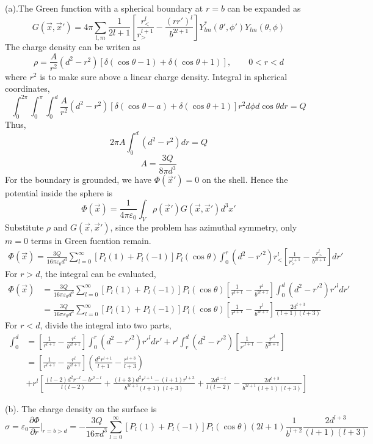 \documentclass{article}
\newcommand{\pd}[2]{\frac{\partial#1}{\partial#2}}
\begin{document}
(a).The Green function with a spherical boundary at $r=b$ can be expanded as
\[ G(\vec x,\vec x')=4\pi\sum_{l,m}\frac{1}{2l+1}[\frac{r_<^l}{r_>^{l+1}}-\frac{(rr')^l}{b^{2l+1}}]Y^*_{lm}(\theta',\phi')Y_{lm}(\theta,\phi)   \]
The charge density can be writen as
\[\rho=\frac{A}{r^2}(d^2-r^2)[\delta(\cos\theta-1)+\delta(\cos\theta+1)],\qquad 0<r<d \]
where $r^2$ is to make sure above a linear charge density. Integral in spherical coordinates,
\[ \int_0^{2\pi}\int_0^{\pi}\int_0^d\frac{A}{r^2}(d^2-r^2)[\delta(\cos\theta-a)+\delta(\cos\theta+1)]r^2d\phi d\cos\theta dr=Q \]
Thus,
\[2\pi A\int_0^d (d^2-r^2)dr=Q\]
\[ A=\frac{3Q}{8\pi d^3}\]
For the boundary is grounded, we have $\Phi(\vec x')=0$ on the shell. Hence the potential inside the sphere is
\[\Phi(\vec x)=\frac{1}{4\pi\varepsilon_0}\int_V\rho(\vec x')G(\vec x,\vec x')d^3 x'\]
Substitute $\rho$ and $G(\vec x,\vec x')$, since the problem has azimuthal symmetry, only $m=0$ terms in Green fucntion remain.
\begin{align*}
  \Phi(\vec x)=\frac{3Q}{16\pi\varepsilon_0 d^3}\sum^\infty_{l=0}[P_l(1)+P_l(-1)]P_l(\cos\theta)\int_0^r(d^2-r'^2)r_<^l[\frac{1}{r_>^{l+1}}-\frac{r_>^l}{b^{2l+1}}]dr'
\end{align*}
For $r>d$, the integral can be evaluated,
\begin{align*}
  \Phi(\vec x)&=\frac{3Q}{16\pi\varepsilon_0 d^3}\sum^\infty_{l=0}[P_l(1)+P_l(-1)]P_l(\cos\theta)[\frac{1}{r^{l+1}}-\frac{r^l}{b^{2l+1}}]\int_0^d(d^2-r'^2)r'^ldr'\\
              &=\frac{3Q}{16\pi\varepsilon_0 d^3}\sum^\infty_{l=0}[P_l(1)+P_l(-1)]P_l(\cos\theta)[\frac{1}{r^{l+1}}-\frac{r^l}{b^{2l+1}}]\frac{2d^{l+3}}{(l+1)(l+3)}
\end{align*}
For $r<d$, divide the integral into two parts,
\begin{align*}
  \int_0^d&=[\frac{1}{r^{l+1}}-\frac{r^l}{b^{2l+1}}]\int_0^r(d^2-r'^2)r'^ldr'+r^{l}\int_r^d(d^2-r'^2)[\frac{1}{r'^{l+1}}-\frac{r'^l}{b^{2l+1}}]\\
  &=[\frac{1}{r^{l+1}}-\frac{r^l}{b^{2l+1}}](\frac{d^2r^{l+1}}{l+1}-\frac{r^{l+3}}{l+3})\\&+r^l[\frac{(l-2)d^2r^{-l}-lr^{2-l}}{l(l-2)}+\frac{(l+3)d^2r^{l+1}-(l+1)r^{l+3}}{b^{2l+1}(l+1)(l+3)}+\frac{2d^{2-l}}{l(l-2)}-\frac{2d^{l+3}}{b^{2l+1}(l+1)(l+3)}]
\end{align*}\par
(b).
The charge density on the surface is
\[\sigma=\varepsilon_0\pd{\Phi}{r}|_{r=b>d}=-\frac{3Q}{16\pi d^3}\sum^\infty_{l=0}[P_l(1)+P_l(-1)]P_l(\cos\theta)(2l+1)\frac{1}{b^{l+2}}\frac{2d^{l+3}}{(l+1)(l+3)}\]\par
\end{document}
